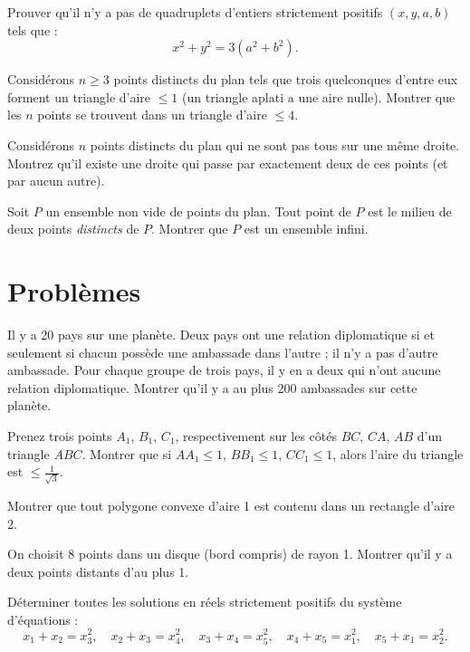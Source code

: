 \begin{exercise}[E9]
	Prouver qu'il n'y a pas de quadruplets d'entiers strictement positifs $(x,y,a,b)$ tels que :
	\[
	x^2 + y^2 = 3 (a^2 + b^2).
	\]
\end{exercise}

\begin{exercise}[E3]
	Considérons $n \geq 3$ points distincts du plan tels que trois quelconques d'entre eux forment un triangle d'aire $\leq 1$ (un triangle aplati a une aire nulle).
	Montrer que les $n$ points se trouvent dans un triangle d'aire $\leq 4$.
\end{exercise}

\begin{exercise}[E10]
	Considérons $n$ points distincts du plan qui ne sont pas tous sur une même droite. 
	Montrez qu'il existe une droite qui passe par exactement deux de ces points (et par aucun autre). 
\end{exercise}

\begin{exercise}[E5]
	Soit $P$ un ensemble non vide de points du plan. 
	Tout point de $P$ est le milieu de deux points \emph{distincts} de $P$.
	Montrer que $P$ est un ensemble infini.
\end{exercise}

\section{Problèmes}
\begin{problem}[12]
	Il y a 20 pays sur une planète.
	Deux pays ont une relation diplomatique si et seulement si chacun possède une ambassade dans l'autre ; il n'y a pas d'autre ambassade.
	Pour chaque groupe de trois pays, il y en a deux qui n'ont aucune relation diplomatique.
	Montrer qu'il y a au plus 200 ambassades sur cette planète.  
\end{problem}

\begin{problem}[23]
	Prenez trois points $A_1$, $B_1$, $C_1$, respectivement sur les côtés $BC$, $CA$, $AB$ d'un triangle $ABC$.
	Montrer que si $AA_1 \leq 1$, $BB_1 \leq 1$, $CC_1 \leq 1$, alors l'aire du triangle est $\leq \frac{1}{\sqrt{3}}$.
\end{problem}

\begin{problem}[21]
	Montrer que tout polygone convexe d'aire 1 est contenu dans un rectangle d'aire 2. 
\end{problem}

\begin{problem}[28]
	On choisit 8 points dans un disque (bord compris) de rayon 1.
	Montrer qu'il y a deux points distants d'au plus 1.
\end{problem}

\begin{problem}[32]
	Déterminer toutes les solutions en réels strictement positifs du système d'équations :
	\[
	x_1 + x_2 = x_3^2,
	\quad
	x_2 + x_3 = x_4^2,
	\quad
	x_3 + x_4 = x_5^2,
	\quad
	x_4 + x_5 = x_1^2,
	\quad
	x_5 + x_1 = x_2^2.
	\]
\end{problem}
